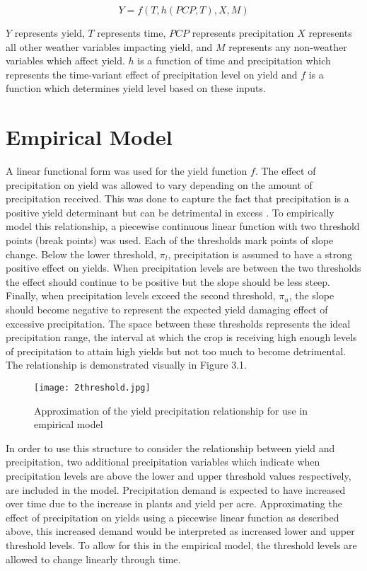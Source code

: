\begin{equation}
Y=f(T,h(PCP,T),X,M)
\end{equation}

$Y$ represents yield, $T$ represents time, $PCP$ represents precipitation $X$ represents all other weather variables impacting yield, and $M$ represents any non-weather variables which affect yield. $h$ is a function of time and precipitation which represents the time-variant effect of precipitation level on yield and $f$ is a function which determines yield level based on these inputs. 

\section{Empirical Model}


A linear functional form was used for the yield function $f$. The effect of precipitation on yield was allowed to vary depending on the amount of precipitation received. This was done to capture the fact that precipitation is a positive yield determinant but can be detrimental in excess \citep{rosenzweig2002increased}. To empirically model this relationship, a piecewise continuous linear function with two threshold points (break points) was used. Each of the thresholds mark points of slope change. Below the lower threshold, $\pi_l$, precipitation is assumed to have a strong positive effect on yields. When precipitation levels are between the two thresholds the effect should continue to be positive but the slope should be less steep. Finally, when precipitation levels exceed the second threshold, $\pi_u$, the slope should become negative to represent the expected yield damaging effect of excessive precipitation. The space between these thresholds represents the ideal precipitation range, the interval at which the crop is receiving high enough levels of precipitation to attain high yields but not too much to become detrimental. The relationship is demonstrated visually in Figure 3.1.

\begin{figure}
 \texttt{[image: 2threshold.jpg]}
    \caption{Approximation of the yield precipitation relationship for use in empirical model}
 \end{figure}
    
In order to use this structure to consider the relationship between yield and precipitation, two additional precipitation variables which indicate when precipitation levels are above the lower and upper threshold values respectively, are included in the model. Precipitation demand is expected to have increased over time due to the increase in plants and yield per acre. Approximating the effect of precipitation on yields using a piecewise linear function as described above, this increased demand would be interpreted as increased lower and upper threshold levels. To allow for this in the empirical model, the threshold levels are allowed to change linearly through time.

